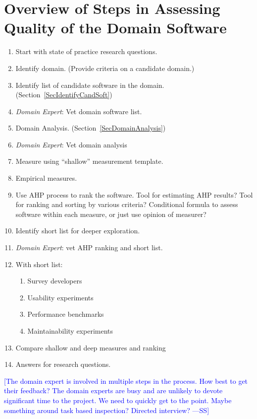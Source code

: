 \documentclass[letterpaper,cleveref]{lipics-v2019}
\newcommand{\authornote}[3]{\textcolor{#1}{[#3 ---#2]}}
\newcommand{\authornote}[3]{}
\newcommand{\wss}[1]{\authornote{blue}{SS}{#1}} %
\theoremstyle{definition}
\begin{document}
\section{Overview of Steps in Assessing Quality of the Domain Software}

\begin{enumerate}
\item Start with state of practice research questions.
\item Identify domain.  (Provide criteria on a candidate domain.)
\item Identify list of candidate software in the domain.  (Section~\ref{SecIdentifyCandSoft})
\item \emph{Domain Expert}: Vet domain software list.  
\item Domain Analysis. (Section~\ref{SecDomainAnalysis})
\item \emph{Domain Expert}: Vet domain analysis
\item Measure using ``shallow'' measurement template.
\item Empirical measures.
\item Use AHP process to rank the software.  Tool for estimating AHP results?
  Tool for ranking and sorting by various criteria?  Conditional formula to
  assess software within each measure, or just use opinion of measurer?
\item Identify short list for deeper exploration.
\item \emph{Domain Expert}: vet AHP ranking and short list.
\item With short list:
\begin{enumerate}
\item Survey developers
\item Usability experiments
\item Performance benchmarks
\item Maintainability experiments
\end{enumerate}
\item Compare shallow and deep measures and ranking
\item Answers for research questions.
\end{enumerate}

\wss{The domain expert is involved in multiple steps in the process.  How best
  to get their feedback?  The domain experts are busy and are unlikely to devote
  significant time to the project.  We need to quickly get to the point.  Maybe
  something around task based inspection?  Directed interview?}
\end{document}
